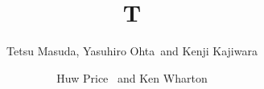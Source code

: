 \documentclass{article}
\begin{document}
\title{T}
\author{Tetsu Masuda\dag, Yasuhiro Ohta\ddag~and Kenji Kajiwara\dag \and Huw Price {\ and} Ken Wharton}
\maketitle
\end{document}
